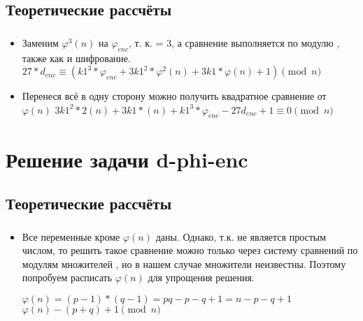 \documentclass[t]{beamer}
\begin{document}
\subsection{Теоретические рассчёты}
\begin{frame}
	\frametitle{\insertsection}
	\framesubtitle{\insertsubsection}
	\begin{itemize}
            \item Заменим $\varphi^3(n)$ на $\varphi_{enc}$, т. к. = 3, а сравнение выполняется по модулю , также как и шифрование.\newline\newline
            \( 27*d_{enc} \equiv (k1^3*\varphi_{enc} + 3k1^2*\varphi^2(n) + 3k1*\varphi(n) + 1) \pmod{n} \)\newline
            \item Перенеся всё в одну сторону можно получить квадратное сравнение от $\varphi(n)$\newline\newline
            \( 3k1^2*2(n)+3k1*(n)+k1^3*\varphi_{enc} - 27d_{enc} + 1 \equiv 0 \pmod{n} \)\newline
	\end{itemize}
\end{frame}

\section{Решение задачи d-phi-enc}
\subsection{Теоретические рассчёты}
\begin{frame}[t] %
	\frametitle{\insertsection}
	\framesubtitle{\insertsubsection}
	\begin{itemize}
            \item Все переменные кроме $\varphi(n)$ даны. Однако, т.к.  не является простым числом, то решить такое сравнение можно только через систему сравнений по модулям множителей , но в нашем случае множители неизвестны. Поэтому попробуем расписать $\varphi(n)$ для упрощения решения.\newline\newline
            \begin{center}
            \( \varphi(n)=(p-1)*(q-1)=pq-p-q+1=n-p-q+1 \)\newline
            \( \varphi(n)-(p+q)+1 \pmod{n} \)
            \end{center}
	\end{itemize}
\end{frame}
\end{document}
